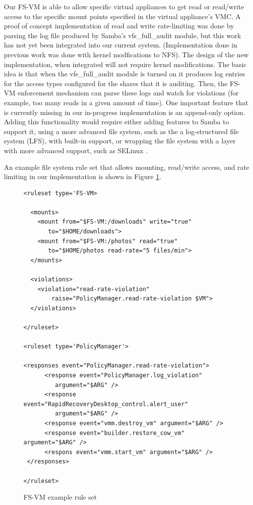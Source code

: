 Our FS-VM is able to allow specific virtual appliances to get read or read/write access to the specific mount points specified in the virtual appliance's VMC. A proof of concept implementation of read and write rate-limiting was done by parsing the log file produced by Samba's vfs\_full\_audit module, but this work has not yet been integrated into our current system. (Implementation done in previous work\cite{rapid_recovery_paper_05} was done with kernel modfications to NFS). The design of the new implementation, when integrated will not require kernel modifications. The basic idea is that when the  vfs\_full\_audit module is turned on it produces log entries for the access types configured for the shares that it is auditing. Then, the FS-VM enforcement mechanism can parse these logs and watch for violations (for example, too many reads in a given amount of time). One important feature that is currently missing in our in-progress implementation is an append-only option. Adding this functionality would require either adding features to Samba to support it, using a more advanced file system, such as the a log-structured file system (LFS)\cite{rosenblum_lfs_1992 }, with built-in support, or wrapping the file system with a layer with more advanced support, such as SELinux \cite{smalley_2001}.

An example file system rule set that allows mounting, read/write access, and rate limiting in our implementation is shown in Figure \ref{lst:fs_vm}.

\begin{figure}[tbp]
\caption{FS-VM example rule set}
\label{lst:fs_vm}
\begin{lstlisting}
<ruleset type='FS-VM>

  <mounts>
    <mount from="$FS-VM:/downloads" write="true"
       to="$HOME/downloads">
    <mount from="$FS-VM:/photos" read="true" 
       to="$HOME/photos read-rate="5 files/min">
  </mounts>

  <violations>
    <violation="read-rate-violation" 
        raise="PolicyManager.read-rate-violation $VM">
  </violations>

</ruleset>

<ruleset type='PolicyManager'>

<responses event="PolicyManager.read-rate-violation">
      <response event="PolicyManager.log_violation" 
         argument="$ARG" />
      <response event="RapidRecoveryDesktop_control.alert_user" 
         argument="$ARG" />      
      <response event="vmm.destroy_vm" argument="$ARG" />
      <response event="builder.restore_cow_vm" argument="$ARG" />
      <respons event="vmm.start_vm" argument="$ARG" />
 </responses>

</ruleset>
\end{lstlisting}
\end{figure}

